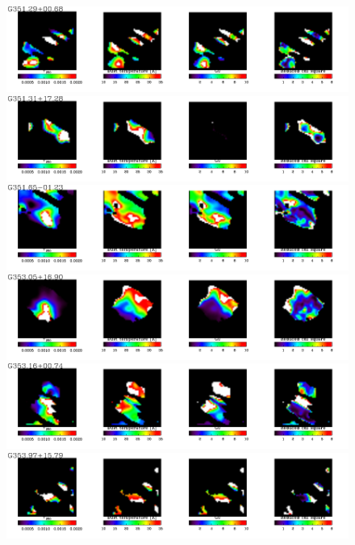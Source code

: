  \begin{figure}
\centering
\includegraphics[trim=0 2mm 0 0, clip, width=190mm]{appA/appA_90.pdf}
\includegraphics[trim=0 2mm 0 0, clip, width=190mm]{appA/appA_91.pdf}
\includegraphics[trim=0 2mm 0 0, clip, width=190mm]{appA/appA_92.pdf}
\includegraphics[trim=0 2mm 0 0, clip, width=190mm]{appA/appA_93.pdf}
\includegraphics[trim=0 2mm 0 0, clip, width=190mm]{appA/appA_94.pdf}
\includegraphics[trim=0 2mm 0 0, clip, width=190mm]{appA/appA_95.pdf}
  \end{figure}
  
  